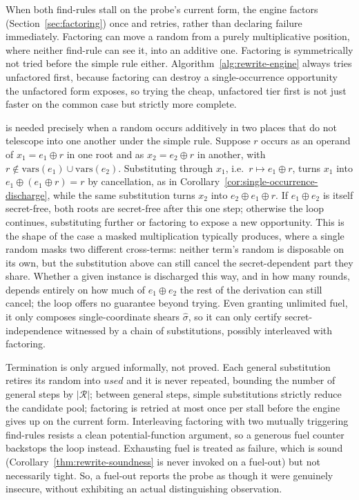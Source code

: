   When both find-rules stall on the probe's current form, the engine factors
  (Section~\ref{sec:factoring}) once and retries, rather than declaring failure
  immediately. Factoring can move a random from a purely multiplicative position,
  where neither find-rule can see it, into an additive one.
  Factoring is symmetrically not tried before the
  simple rule either. Algorithm~\ref{alg:rewrite-engine} always tries
   unfactored first, because factoring can destroy a
  single-occurrence opportunity the unfactored form exposes, so trying the cheap,
  unfactored tier first is not just faster on the common case but strictly more
  complete.

   is needed precisely when a random occurs additively in two
  places that do not telescope into one another under the simple rule. Suppose $r$
  occurs as an operand of $x_1 = e_1 \oplus r$ in one root and as $x_2 = e_2 \oplus r$
  in another, with $r \notin \mathrm{vars}(e_1) \cup \mathrm{vars}(e_2)$.
  Substituting through $x_1$, i.e.\ $r \mapsto e_1 \oplus r$, turns $x_1$ into
  $e_1 \oplus (e_1 \oplus r) = r$ by cancellation, as in
  Corollary~\ref{cor:single-occurrence-discharge}, while the same substitution turns
  $x_2$ into $e_2 \oplus e_1 \oplus r$. If $e_1 \oplus e_2$ is itself secret-free,
  both roots are secret-free after this one step; otherwise the loop continues,
  substituting further or factoring to expose a new opportunity. This is the shape of
  the case a masked multiplication typically produces, where a single random masks
  two different cross-terms: neither term's random is disposable on its own, but the
  substitution above can still cancel the secret-dependent part they share. Whether a
  given instance is discharged this way, and in how many rounds, depends entirely on
  how much of $e_1 \oplus e_2$ the rest of the derivation can still cancel; the loop
  offers no guarantee beyond trying. Even granting unlimited fuel, it only composes
  single-coordinate shears $\widehat{\sigma}$, so it can only certify
  secret-independence witnessed by a chain of substitutions, possibly interleaved
  with factoring.

  Termination is only argued informally, not proved. Each general substitution
  retires its random into $\mathit{used}$ and it is never repeated, bounding the
  number of general steps by $|\mathcal{R}|$; between general steps, simple
  substitutions strictly reduce the candidate pool; factoring is retried at most once
  per stall before the engine gives up on the current form. Interleaving factoring
  with two mutually triggering find-rules resists a clean potential-function
  argument, so a generous fuel counter backstops the loop instead. Exhausting fuel is
  treated as failure, which is sound (Corollary~\ref{thm:rewrite-soundness} is never
  invoked on a fuel-out) but not necessarily tight. So, a fuel-out reports the probe as
  though it were genuinely insecure, without exhibiting an actual distinguishing
  observation.

